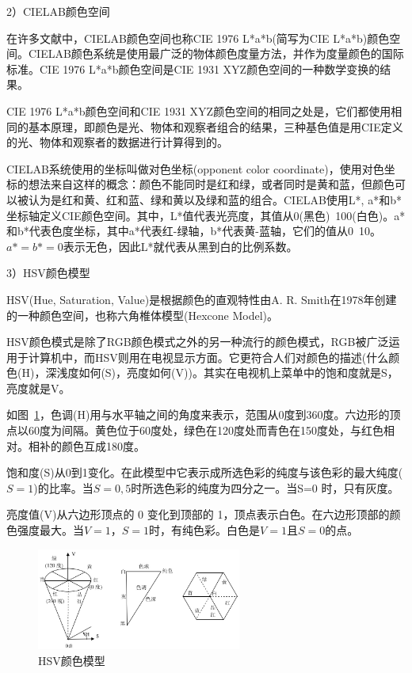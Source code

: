 \documentclass[12pt]{article}
\begin{document}
2）CIELAB颜色空间

在许多文献中，CIELAB颜色空间也称CIE 1976 L*a*b(简写为CIE L*a*b)颜色空间。CIELAB颜色系统是使用最广泛的物体颜色度量方法，并作为度量颜色的国际标准。CIE 1976 L*a*b颜色空间是CIE 1931 XYZ颜色空间的一种数学变换的结果。

CIE 1976 L*a*b颜色空间和CIE 1931 XYZ颜色空间的相同之处是，它们都使用相同的基本原理，即颜色是光、物体和观察者组合的结果，三种基色值是用CIE定义的光、物体和观察者的数据进行计算得到的。

CIELAB系统使用的坐标叫做对色坐标(opponent color coordinate)，使用对色坐标的想法来自这样的概念：颜色不能同时是红和绿，或者同时是黄和蓝，但颜色可以被认为是红和黄、红和蓝、绿和黄以及绿和蓝的组合。CIELAB使用L*, a*和b*坐标轴定义CIE颜色空间。其中，L*值代表光亮度，其值从0(黑色)~100(白色)。a*和b*代表色度坐标，其中a*代表红-绿轴，b*代表黄-蓝轴，它们的值从0~10。$a*=b*=0$表示无色，因此L*就代表从黑到白的比例系数。

3）HSV颜色模型

HSV(Hue, Saturation, Value)是根据颜色的直观特性由A. R. Smith在1978年创建的一种颜色空间，也称六角椎体模型(Hexcone Model)。

HSV颜色模式是除了RGB颜色模式之外的另一种流行的颜色模式，RGB被广泛运用于计算机中，而HSV则用在电视显示方面。它更符合人们对颜色的描述(什么颜色(H)，深浅度如何(S)，亮度如何(V))。其实在电视机上菜单中的饱和度就是S，亮度就是V。

如图~\ref{fig: HSV}，色调(H)用与水平轴之间的角度来表示，范围从0度到360度。六边形的顶点以60度为间隔。黄色位于60度处，绿色在120度处而青色在150度处，与红色相对。相补的颜色互成180度。

饱和度(S)从0到1变化。在此模型中它表示成所选色彩的纯度与该色彩的最大纯度($S=1$)的比率。当$S=0,5$时所选色彩的纯度为四分之一。当S=0 时，只有灰度。

亮度值(V)从六边形顶点的 0 变化到顶部的 1，顶点表示白色。在六边形顶部的颜色强度最大。当$ V=1$，$S=1$时，有纯色彩。白色是$V=1$且$S=0$的点。

\begin{figure}[!ht]
\centering
\includegraphics[width=0.6\textwidth]{HSV.jpg}
\caption{HSV颜色模型}
\label{fig: HSV}
\end{figure} 
\end{document}
